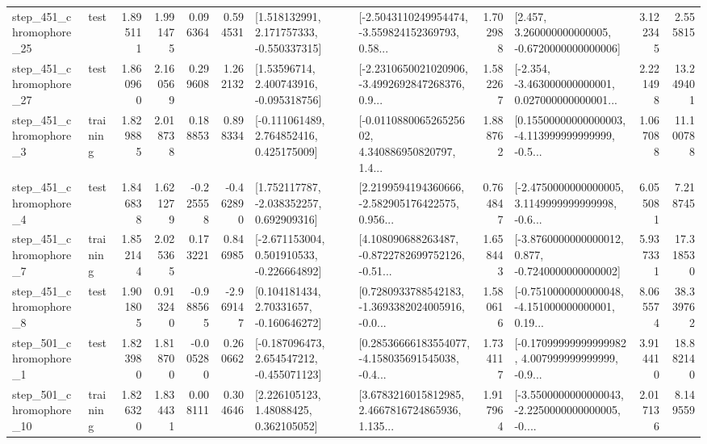 \begin{tabular}{llrrrrllrlrr}
  step\_451\_chromophore\_25 &      test &      1.895111 &    1.991475 &      0.096364 &  0.594531 &    [1.518132991, 2.171757333, -0.550337315] &  [-2.5043110249954474, -3.559824152369793, 0.58... &       1.702988 &    [2.457, 3.260000000000005, -0.6720000000000006] &            3.122345 &          2.555815 \\
  step\_451\_chromophore\_27 &      test &      1.860960 &    2.160569 &      0.299608 &  1.262132 &     [1.53596714, 2.400743916, -0.095318756] &  [-2.2310650021020906, -3.4992692847268376, 0.9... &       1.582267 &  [-2.354, -3.463000000000001, 0.027000000000001... &            2.221498 &         13.249401 \\
   step\_451\_chromophore\_3 &  training &      1.829885 &    2.018738 &      0.188853 &  0.898334 &    [-0.111061489, 2.764852416, 0.425175009] &  [-0.011088006526525602, 4.340886950820797, 1.4... &       1.888762 &  [0.15500000000000003, -4.113999999999999, -0.5... &            1.067088 &         11.100788 \\
   step\_451\_chromophore\_4 &      test &      1.846838 &    1.621279 &     -0.225558 & -0.462890 &    [1.752117787, -2.038352257, 0.692909316] &  [2.2199594194360666, -2.582905176422575, 0.956... &       0.764847 &  [-2.4750000000000005, 3.1149999999999998, -0.6... &            6.055081 &          7.218745 \\
   step\_451\_chromophore\_7 &  training &      1.852144 &    2.025365 &      0.173221 &  0.846985 &   [-2.671153004, 0.501910533, -0.226664892] &  [4.108090688263487, -0.8722782699752126, -0.51... &       1.658443 &  [-3.8760000000000012, 0.877, -0.7240000000000002] &            5.937331 &         17.318530 \\
   step\_451\_chromophore\_8 &      test &      1.901805 &    0.913240 &     -0.988565 & -2.969147 &     [0.104181434, 2.70331657, -0.160646272] &  [0.7280933788542183, -1.3693382024005916, -0.0... &       1.580616 &  [-0.7510000000000048, -4.151000000000001, 0.19... &            8.065574 &         38.339762 \\
   step\_501\_chromophore\_1 &      test &      1.823980 &    1.818700 &     -0.005280 &  0.260662 &   [-0.187096473, 2.654547212, -0.455071123] &  [0.28536666183554077, -4.158035691545038, -0.4... &       1.734117 &  [-0.17099999999999982, 4.007999999999999, -0.9... &            3.914410 &         18.882140 \\
  step\_501\_chromophore\_10 &  training &      1.826320 &    1.834431 &      0.008111 &  0.304646 &      [2.226105123, 1.48088425, 0.362105052] &  [3.6783216015812985, 2.4667816724865936, 1.135... &       1.917964 &  [-3.5500000000000043, -2.2250000000000005, -0.... &            2.017136 &          8.149559 \\

\end{tabular}
